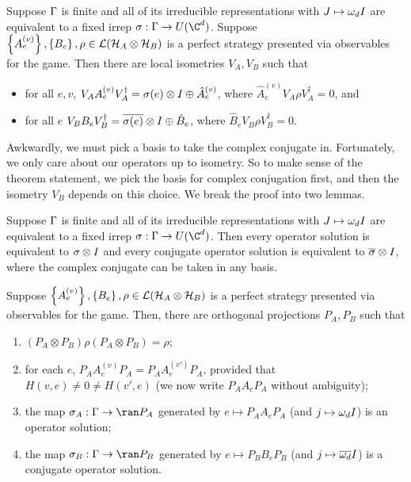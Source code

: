 \begin{thm}\label{thm:rigid-self-testing-observables}
Suppose $\Gamma$ is finite and all of its irreducible representations with $J\mapsto \omega_d I$ are equivalent to a fixed irrep $\s:\G\to U(\C^d)$. Suppose $\left\{A_e^{(v)}\right\}, \left\{B_e\right\}, \rho\in \mathcal L(\mathcal H_A\otimes \mathcal H_B)$ is a perfect strategy presented via observables for the game. 
Then there are local isometries $V_A, V_B$ such that
	\begin{itemize}
		\item for all $e,v$, $V_AA_e^{(v)}V_A^\dagger = \sigma(e)\otimes I \oplus \hat A^{(v)}_e$, where $\hat A^{(v)}_e V_A\rho V_A^\dagger = 0$, and 
		\item for all $e$ $V_BB_eV_B^\dagger =\overline{\sigma(e)}\otimes I \oplus \hat B_e$, where $\hat B_e V_B\rho V_B^\dagger = 0$.
	\end{itemize}
\end{thm}
Awkwardly, we must pick a basis to take the complex conjugate in. Fortunately, we only care about our operators up to isometry. So to make sense of the theorem statement, we pick the basis for complex conjugation first, and then the isometry $V_B$ depends on this choice.
 We break the proof into two lemmas.
\begin{lemma}\label{lem:unique-operator-solution}
	Suppose $\Gamma$ is finite and all of its irreducible representations with $J\mapsto \omega_dI$ are equivalent to a fixed irrep $\s:\G\to U(\C^d)$. Then every operator solution is equivalent to $\sigma\otimes I$ and every conjugate operator solution is equivalent to $\overline{\sigma}\otimes I$, where the complex conjugate can be taken in any basis. 
\end{lemma}

\begin{lemma}\label{lemma:CLS}
Suppose $\left\{A_e^{(v)}\right\}, \left\{B_e\right\}, \rho\in \mathcal L(\mathcal H_A\otimes \mathcal H_B)$ is a perfect strategy presented via observables for the game. 
	Then, there are orthogonal projections $P_A, P_B$ such that 
	\begin{enumerate}
	\item $(P_A\otimes P_B)\rho(P_A\otimes P_B) = \rho$;
	\item for each $e$, $P_AA_e^{(v)}P_A = P_AA_e^{(v')}P_A$, provided that $H(v,e) \neq 0 \neq H(v',e)$ (we now write $P_AA_eP_A$ without ambiguity);
	\item the map $\s_A:\G\to \ran P_A$ generated by $e\mapsto P_AA_eP_A$ (and $j \mapsto \omega_dI$) is an operator solution;
	\item the map $\s_B:\G\to \ran P_B$ generated by $e\mapsto P_BB_eP_B$ (and $j \mapsto \overline{\omega_d}I$) is a conjugate operator solution.
	\end{enumerate}
\end{lemma}

